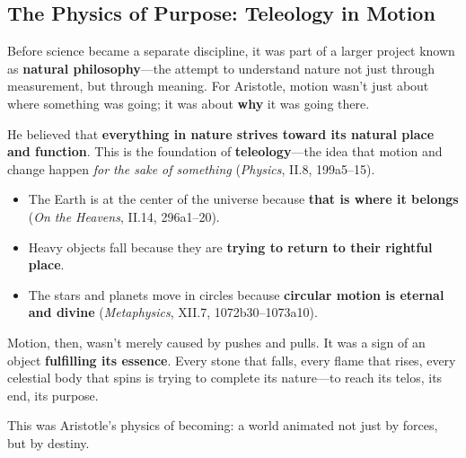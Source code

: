 \subsection{The Physics of Purpose: Teleology in Motion}

Before science became a separate discipline, it was part of a larger project known as \textbf{natural philosophy}—the attempt to understand nature not just through measurement, but through meaning. For Aristotle, motion wasn’t just about where something was going; it was about \textbf{why} it was going there.

He believed that \textbf{everything in nature strives toward its natural place and function}. This is the foundation of \textbf{teleology}—the idea that motion and change happen \textit{for the sake of something} (\textit{Physics}, II.8, 199a5–15).

\begin{itemize}
    \item The Earth is at the center of the universe because \textbf{that is where it belongs} (\textit{On the Heavens}, II.14, 296a1–20).
    \item Heavy objects fall because they are \textbf{trying to return to their rightful place}.
    \item The stars and planets move in circles because \textbf{circular motion is eternal and divine} (\textit{Metaphysics}, XII.7, 1072b30–1073a10).
\end{itemize}

Motion, then, wasn’t merely caused by pushes and pulls. It was a sign of an object \textbf{fulfilling its essence}. Every stone that falls, every flame that rises, every celestial body that spins is trying to complete its nature—to reach its telos, its end, its purpose.

This was Aristotle’s physics of becoming: a world animated not just by forces, but by destiny.

